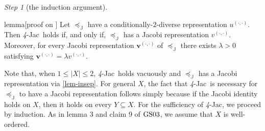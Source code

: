 \documentclass[ecta,nameyear,draft]{econsocart}
\newcommand{\mbbj}{\mathds J}
\newcommand{\dd}{{(\cdot,\cdot)}}
\newcommand{\fourjac}{\textup{\textit{4}-Jac}}
\newcommand{\gsii}{$\textup{GS03}$}
\theoremstyle{plain}
\theoremstyle{remark}
\newtheorem{step}{Step}[section]
\begin{document}
\begin{appendix}
\begin{step}[the induction argument]
    \begin{theoremEnd}{lemma}[proof on
      ]\label{lem-induction} Let
      $\preceq_{\mbbj}$ have a conditionally-$2$-diverse representation
      $u^{\dd}$. Then \fourjac\ holds if, and only if, $\preceq_{\mbbj}$ has a
      Jacobi representation $v^{\dd}$.  Moreover, for every Jacobi
      representation $\mathbf v^{\dd}$ of $\preceq_{\mbbj}$ there exists
      $\lambda > 0$ satisfying $\mathbf v^{(\cdot, \cdot)} = \lambda v^{(\cdot,
      \cdot)}$.
    \end{theoremEnd}

  \begin{proofEnd}\label{proof-lem-induction}%
    Note that, when $1 \leq \lvert X \rvert \leq 2$, \fourjac\ holds vacuously
    and $\preceq_{\mbbj}$ has a Jacobi representation via \cref{lem-insep}. For
    general $X$, the fact that \fourjac\ is necessary for $\preceq_{\mbbj}$ to
    have a Jacobi representation follows simply because if the Jacobi identity
    holds on $X$, then it holds on every $Y\subseteq X$. For the sufficiency of
    \fourjac, we proceed by induction.  As in lemma 3 and claim 9 of \gsii, we
    assume that $X$ is well-ordered.  
  

\end{proofEnd}
\end{step}
\end{appendix}
\end{document}
